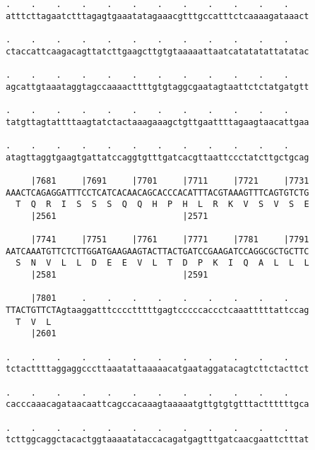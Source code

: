 \documentclass{article}
\begin{document}
\begin{Verbatim}
.    .    .    .    .    .    .    .    .    .    .    .    
atttcttagaatctttagagtgaaatatagaaacgtttgccatttctcaaaagataaact
                                                            
.    .    .    .    .    .    .    .    .    .    .    .    
ctaccattcaagacagttatcttgaagcttgtgtaaaaattaatcatatatattatatac
                                                            
.    .    .    .    .    .    .    .    .    .    .    .    
agcattgtaaataggtagccaaaacttttgtgtaggcgaatagtaattctctatgatgtt
                                                            
.    .    .    .    .    .    .    .    .    .    .    .    
tatgttagtattttaagtatctactaaagaaagctgttgaattttagaagtaacattgaa
                                                            
.    .    .    .    .    .    .    .    .    .    .    .    
atagttaggtgaagtgattatccaggtgtttgatcacgttaattccctatcttgctgcag
                                                            
     |7681     |7691     |7701     |7711     |7721     |7731
AAACTCAGAGGATTTCCTCATCACAACAGCACCCACATTTACGTAAAGTTTCAGTGTCTG
  T  Q  R  I  S  S  S  Q  Q  H  P  H  L  R  K  V  S  V  S  E
     |2561                         |2571                    
  
     |7741     |7751     |7761     |7771     |7781     |7791
AATCAAATGTTCTCTTGGATGAAGAAGTACTTACTGATCCGAAGATCCAGGCGCTGCTTC
  S  N  V  L  L  D  E  E  V  L  T  D  P  K  I  Q  A  L  L  L
     |2581                         |2591                    
  
     |7801     .    .    .    .    .    .    .    .    .    
TTACTGTTCTAgtaaggatttcccctttttgagtcccccaccctcaaatttttattccag
  T  V  L                                                   
     |2601                                                  
  
.    .    .    .    .    .    .    .    .    .    .    .    
tctacttttaggaggcccttaaatattaaaaacatgaataggatacagtcttctacttct
                                                            
.    .    .    .    .    .    .    .    .    .    .    .    
cacccaaacagataacaattcagccacaaagtaaaaatgttgtgtgtttacttttttgca
                                                            
.    .    .    .    .    .    .    .    .    .    .    .    
tcttggcaggctacactggtaaaatataccacagatgagtttgatcaacgaattctttat
                                                            

\end{Verbatim}
\end{document}
